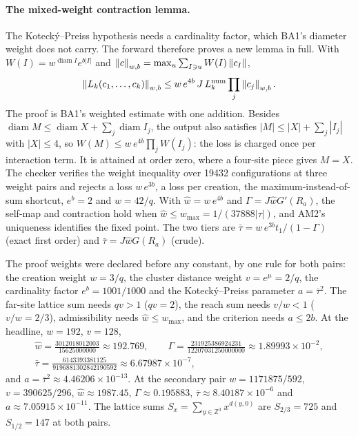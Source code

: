 \paragraph{The mixed-weight contraction lemma.} The Kotecký--Preiss
hypothesis needs a cardinality factor, which BA1's diameter weight does not
carry. The forward therefore proves a new lemma in full. With
$W(I)=w^{\operatorname{diam}I}e^{b|I|}$ and
$\left\lVert c\right\rVert_{w,b}=\max_u\sum_{I\ni u}W(I)\left\lVert c_I\right\rVert$,
\begin{equation}
 \left\lVert L_k(c_1,\ldots,c_k)\right\rVert_{w,b}\le w\,e^{4b}\,J\,L_k^{\rm num}\prod_j\left\lVert c_j\right\rVert_{w,b}.
 \label{eq:bb1-mixed}
\end{equation}
The proof is BA1's weighted estimate with one addition. Besides
$\operatorname{diam}M\le\operatorname{diam}X+\sum_j\operatorname{diam}I_j$, the
output also satisfies $|M|\le|X|+\sum_j|I_j|$ with $|X|\le4$, so
$W(M)\le w\,e^{4b}\prod_jW(I_j)$: the loss is charged once per interaction
term. It is attained at order zero, where a four-site piece gives $M=X$. The
checker verifies the weight inequality over 19432 configurations at three
weight pairs and rejects a loss $w\,e^{3b}$, a loss per creation, the
maximum-instead-of-sum shortcut, $e^b=2$ and $w=42/q$. With $\hat w=w\,e^{4b}$
and $\Gamma=J\hat wG'(R_a)$, the self-map and contraction hold when
$\hat w\le w_{\max}=1/(37888|\tau|)$, and AM2's uniqueness identifies the
fixed point. The two tiers are
$\bar\tau=w\,e^{3b}t_1/(1-\Gamma)$ (exact first order) and
$\bar\tau=J\hat wG(R_a)$ (crude).

The proof weights were declared before any constant, by one rule for both
pairs: the creation weight $w=3/q$, the cluster distance weight $v=e^\mu=2/q$,
the cardinality factor $e^b=1001/1000$ and the Kotecký--Preiss parameter
$a=\bar\tau^2$. The far-site lattice sum needs $qv>1$ ($qv=2$), the reach sum
needs $v/w<1$ ($v/w=2/3$), admissibility needs $\hat w\le w_{\max}$, and the
criterion needs $a\le2b$. At the headline, $w=192$, $v=128$,
\begin{equation}
 \begin{gathered}
 \hat w=\frac{3012018012003}{15625000000}\approx192.769,\qquad
 \Gamma=\frac{231925386924231}{12207031250000000}\approx1.89993\times10^{-2},\\
 \bar\tau=\frac{6143393381125}{9196881302842190592}\approx6.67987\times10^{-7},
 \end{gathered}
 \label{eq:bb1-weights}
\end{equation}
and $a=\bar\tau^2\approx4.46206\times10^{-13}$. At the secondary pair
$w=1171875/592$, $v=390625/296$, $\hat w\approx1987.45$,
$\Gamma\approx0.195883$, $\bar\tau\approx8.40187\times10^{-6}$ and
$a\approx7.05915\times10^{-11}$. The lattice sums
$S_x=\sum_{y\in\mathbb Z^3}x^{d(y,0)}$ are $S_{2/3}=725$ and $S_{1/2}=147$ at
both pairs.

